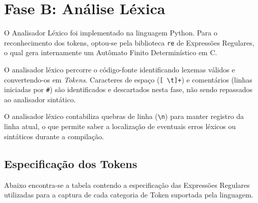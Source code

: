 \documentclass[12pt, a4paper]{article}
\begin{document}
\section{Fase B: Análise Léxica}
O Analisador Léxico foi implementado na linguagem Python. Para o reconhecimento dos tokens, optou-se pela biblioteca \texttt{re} de Expressões Regulares, o qual gera internamente um Autômato Finito Determinístico em C.

O analisador léxico percorre o código-fonte identificando lexemas válidos e convertendo-os em \textit{Tokens}. Caracteres de espaço (\texttt{[ \textbackslash t]+}) e comentários (linhas iniciadas por \texttt{\#}) são identificados e descartados nesta fase, não sendo repassados ao analisador sintático. 

O analisador léxico contabiliza quebras de linha (\texttt{\textbackslash n}) para manter registro da linha atual, o que permite saber a localização de eventuais erros léxicos ou sintáticos durante a compilação.

\subsection{Especificação dos Tokens}
Abaixo encontra-se a tabela contendo a especificação das Expressões Regulares utilizadas para a captura de cada categoria de Token suportada pela linguagem.

\begin{table}[H]
\centering
{}
\caption{Especificação Léxica da Linguagem Homi}
\label{tab:lexico}
\end{table}
\end{document}
